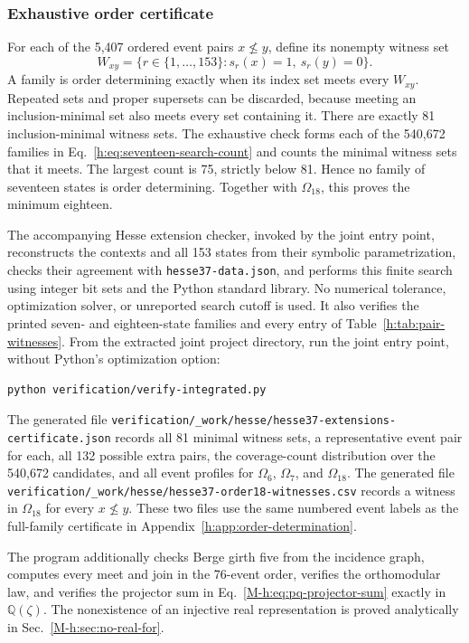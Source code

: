 \documentclass[aps,pra,reprint,superscriptaddress,longbibliography,nofootinbib,floatfix,10pt]{revtex4-2}
\theoremstyle{definition}
\begin{document}
\subsubsection{Exhaustive order certificate}

For each of the 5{,}407 ordered event pairs $x\not\le y$, define its nonempty witness set
\begin{equation}\label{h:eq:order-witness-set}
W_{xy}=\{r\in\{1,\ldots,153\}:s_r(x)=1,\ s_r(y)=0\}.
\end{equation}
A family is order determining exactly when its index set meets every $W_{xy}$. Repeated sets and proper supersets can be discarded, because meeting an inclusion-minimal set also meets every set containing it. There are exactly 81 inclusion-minimal witness sets. The exhaustive check forms each of the 540{,}672 families in Eq.~\eqref{h:eq:seventeen-search-count} and counts the minimal witness sets that it meets. The largest count is 75, strictly below 81. Hence no family of seventeen states is order determining. Together with $\Omega_{18}$, this proves the minimum eighteen.

The accompanying Hesse extension checker, invoked by the joint entry point, reconstructs the contexts and all 153 states from their symbolic parametrization, checks their agreement with \texttt{hesse37-data.json}, and performs this finite search using integer bit sets and the Python standard library. No numerical tolerance, optimization solver, or unreported search cutoff is used. It also verifies the printed seven- and eighteen-state families and every entry of Table~\ref{h:tab:pair-witnesses}. From the extracted joint project directory, run the joint entry point,
without Python's optimization option:
\begin{verbatim}
python verification/verify-integrated.py
\end{verbatim}
The generated file \texttt{verification/\_work/hesse/}\allowbreak\texttt{hesse37-extensions-certificate.json} records all 81 minimal witness sets, a representative event pair for each, all 132 possible extra pairs, the coverage-count distribution over the 540{,}672 candidates, and all event profiles for $\Omega_6$, $\Omega_7$, and $\Omega_{18}$. The generated file \texttt{verification/\_work/hesse/}\allowbreak\texttt{hesse37-order18-witnesses.csv} records a witness in $\Omega_{18}$ for every $x\not\le y$. These two files use the same numbered event labels as the full-family certificate in Appendix~\ref{h:app:order-determination}.

The program additionally checks Berge girth five from the incidence graph, computes every meet and join in the 76-event order, verifies the orthomodular law, and verifies the projector sum in Eq.~\eqref{M-h:eq:pq-projector-sum} exactly in $\mathbb Q(\zeta)$. The nonexistence of an injective real representation is proved analytically in Sec.~\ref{M-h:sec:no-real-for}.
\end{document}
